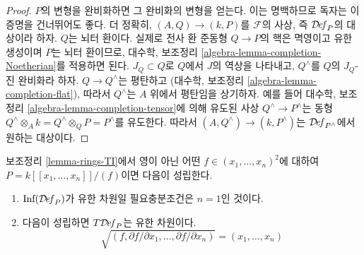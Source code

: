 \begin{proof}
$P$의 변형을 완비화하면 그 완비화의 변형을 얻는다. 이는 명백하므로
독자는 이 증명을 건너뛰어도 좋다. 더 정확히, $(A, Q) \to (k, P)$를
$\mathcal{F}$의 사상, 즉 $\mathcal{D}\!\mathit{ef}_P$의 대상이라 하자.
$Q$는 뇌터 환이다. 실제로 전사 환 준동형 $Q \to P$의 핵은 멱영이고
유한 생성이며 $P$는 뇌터 환이므로, 대수학, 보조정리
\ref{algebra-lemma-completion-Noetherian}를 적용하면 된다.
$J_Q \subset Q$로 $Q$에서 $J$의 역상을 나타내고, $Q^\wedge$를 $Q$의
$J_Q$-진 완비화라 하자. $Q \to Q^\wedge$는 평탄하고
(대수학, 보조정리 \ref{algebra-lemma-completion-flat}), 따라서
$Q^\wedge$는 $A$ 위에서 평탄임을 상기하자. 예를 들어 대수학, 보조정리
\ref{algebra-lemma-completion-tensor}에 의해 유도된 사상
$Q^\wedge \to P^\wedge$는 동형
$Q^\wedge \otimes_A k = Q^\wedge \otimes_Q P = P^\wedge$를 유도한다.
따라서 $(A, Q^\wedge) \to (k, P^\wedge)$는
$\mathcal{D}\!\mathit{ef}_{P^\wedge}$에서 원하는 대상이다.
\end{proof}

\begin{lemma}
\label{lemma-power-series-rings-TI}
보조정리 \ref{lemma-rings-TI}에서 영이 아닌 어떤
$f \in (x_1, \ldots, x_n)^2$에 대하여
$P = k[[x_1, \ldots, x_n]]/(f)$이면 다음이 성립한다.
\begin{enumerate}
\item $\text{Inf}(\mathcal{D}\!\mathit{ef}_P)$가 유한 차원일 필요충분조건은
$n = 1$인 것이다.
\item 다음이 성립하면 $T\mathcal{D}\!\mathit{ef}_P$는 유한 차원이다.
$$
\sqrt{(f, \partial f/\partial x_1, \ldots,  \partial f/\partial x_n)} =
(x_1, \ldots, x_n)
$$
\end{enumerate}
\end{lemma}

